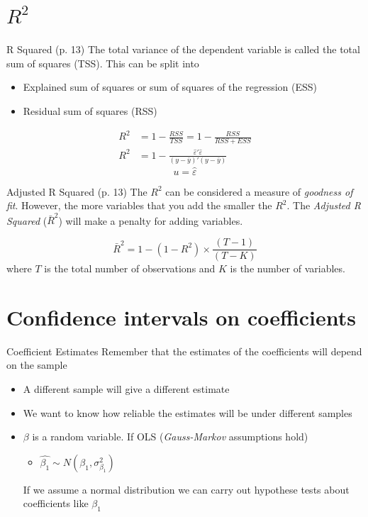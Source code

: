 \documentclass[14pt,xcolor=pdftex,dvipsnames,table]{beamer}\usepackage{graphicx, color}
\begin{document}
\section{$R^2$}
\begin{frame}{R Squared (p. 13)}
The total variance of the dependent variable is called the total sum of squares (TSS).  This can be split into 
\begin{itemize}[<+-| alert@+>]
\item Explained sum of squares or sum of squares of the regression (ESS)
\item Residual sum of squares (RSS)
\end{itemize}
\pause
\begin{align*}
R^2 &= 1 - \frac{RSS}{TSS} = 1 - \frac{RSS}{RSS + ESS}\\
R^2 &= 1 - \frac{\hat{\varepsilon}'\hat{\varepsilon}}{(y - \bar{y})'(y - \bar{y})}
\end{align*}
\begin{equation}
u = \hat{\varepsilon}
\end{equation}
\end{frame}

\begin{frame}{Adjusted R Squared (p. 13)}
The $R^2$ can be considered a measure of \emph{goodness of fit}.  However, the more variables that you add the smaller the $R^2$. The \emph{Adjusted R Squared} ($\bar{R}^2$) will make a penalty for adding variables. 

\begin{equation}
\bar{R}^2 = 1 - (1 - R^2) \times \frac{(T - 1)}{(T - K)}
\end{equation}
where $T$ is the total number of observations and $K$ is the number of variables. 
\end{frame}


\section{Confidence intervals on coefficients}
\begin{frame}{Coefficient Estimates}
Remember that the estimates of the coefficients will depend on the sample
\begin{itemize}[<+-| alert@+>]
\item A different sample will give a different estimate
\item We want to know how reliable the estimates will be under different samples
\item $\beta$ is a random variable.  If OLS (\emph{Gauss-Markov} assumptions hold)
\begin{itemize}
\item $\hat{\beta_1} \sim N (\beta_1, \sigma_{\beta_1}^2)$
\end{itemize}
\pause
If we assume a normal distribution we can carry out hypothese tests about coefficients like $\beta_1$
\end{itemize}
\end{frame}
\end{document}
